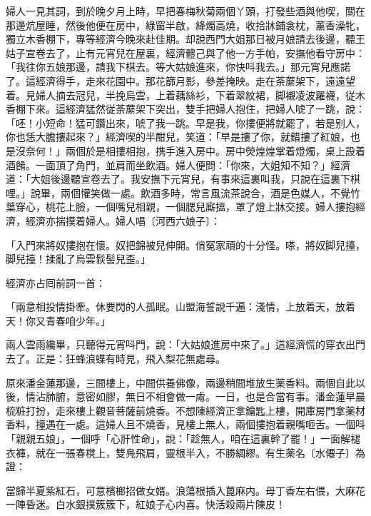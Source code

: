 婦人一見其詞，到於晚夕月上時，早把春梅秋菊兩個丫頭，打發些酒與他喫，關在那邊炕屋睡，然後他便在房中，綠窗半啟，絳燭高燒，收拾牀鋪衾枕，薰香澡牝，獨立木香棚下，專等經濟今晚來赴佳期。却說西門大姐那日被月娘請去後邊，聽王姑子宣卷去了，止有元宵兒在屋裏，經濟體己與了他一方手帕，安撫他看守房中：「我往你五娘那邊，請我下棋去。等大姑娘進來，你快呌我去。」那元宵兒應諾了。這經濟得手，走來花園中。那花篩月影，參差掩映。走在荼䕷架下，遠遠望着。見婦人摘去冠兒，半挽烏雲，上着藕絲衫，下着翠紋裙，脚襯凌波羅襪，従木香棚下來。這經濟猛然従荼䕷架下突出，雙手把婦人抱住，把婦人唬了一跳，說：「呸！小短命！猛可鑽出來，唬了我一跳。早是我，你摟便將就罷了，若是别人，你也恁大膽摟起來？」經濟喫的半酣兒，笑道：「早是摟了你，就錯摟了紅娘，也是沒奈何！」兩個於是相摟相抱，携手進入房中。房中熒煌煌掌着燈燭，桌上設着酒餚。一面頂了角門，並肩而坐飲酒。婦人便問：「你來，大姐知不知？」經濟道：「大姐後邊聽宣卷去了。我安撫下元宵兒，有事來這裏叫我，只說在這裏下棋哩。」說畢，兩個懽笑做一處。飲酒多時，常言風流茶說合，酒是色媒人，不覺竹葉穿心，桃花上臉，一個嘴兒相親，一個腮兒廝搵，罩了燈上牀交接。婦人摟抱經濟，經濟亦揣摸着婦人。婦人唱〔河西六娘子〕：

\begin{myquote}
「入門來將奴摟抱在懷。奴把錦被兒伸開。俏冤家頑的十分怪。嗏，將奴脚兒擡，脚兒擡！揉亂了烏雲䯼髻兒歪。」
\end{myquote}

經濟亦占囘前詞一首：

\begin{myquote}
「兩意相投情掛牽。休要閃的人孤眠。山盟海誓說千遍：淺情，上放着天，放着天！你又青春咱少年。」
\end{myquote}

兩人雲雨纔畢，只聽得元宵呌門，說：「大姑娘進房中來了。」這經濟慌的穿衣出門去了。正是：狂蜂浪蝶有時見，飛入梨花無處尋。

原來潘金蓮那邊，三間樓上，中間供養佛像，兩邊稍間堆放生薬香料。兩個自此以後，情沾肺腑，意密如膠，無日不相會做一䖏。一日，也是合當有事。潘金蓮早晨梳粧打扮，走來樓上觀音菩薩前燒香。不想陳經濟正拿鑰匙上樓，開庫房門拿薬材香料，撞遇在一處。這婦人且不燒香，見樓上無人，兩個摟抱着親嘴咂舌。一個呌「親親五娘」，一個呼「心肝性命」，說：「趁無人，咱在這裏幹了罷！」一面解褪衣褲，就在一張春櫈上，雙鳧飛肩，靈根半入，不勝綢繆。有生薬名〔水僊子〕為證：

\begin{myquote}
當歸半夏紫紅石，可意檳榔招做女婿。浪蕩根插入蓖麻内。母丁香左右偎，大麻花一陣昏迷。白水銀撲簇簇下，紅娘子心内喜。快活殺兩片陳皮！
\end{myquote}

